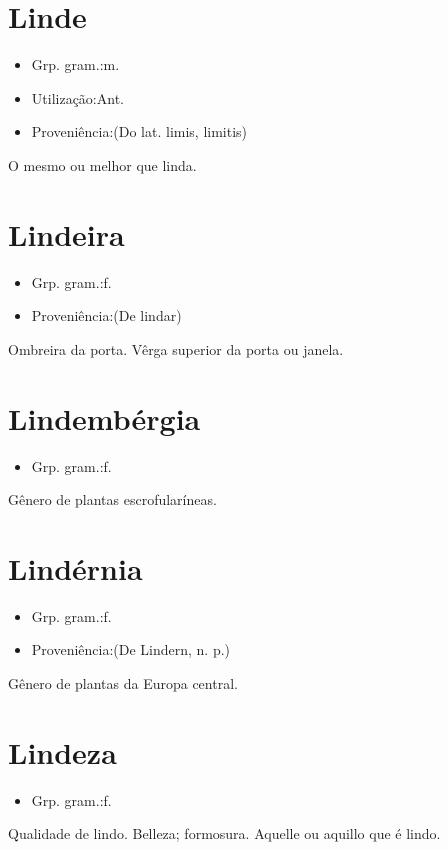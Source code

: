 \section{Linde}
\begin{itemize}
\item {Grp. gram.:m.}
\end{itemize}
\begin{itemize}
\item {Utilização:Ant.}
\end{itemize}
\begin{itemize}
\item {Proveniência:(Do lat. \textunderscore limis\textunderscore , \textunderscore limitis\textunderscore )}
\end{itemize}
O mesmo ou melhor que \textunderscore linda\textunderscore .
\section{Lindeira}
\begin{itemize}
\item {Grp. gram.:f.}
\end{itemize}
\begin{itemize}
\item {Proveniência:(De \textunderscore lindar\textunderscore )}
\end{itemize}
Ombreira da porta.
Vêrga superior da porta ou janela.
\section{Lindembérgia}
\begin{itemize}
\item {Grp. gram.:f.}
\end{itemize}
Gênero de plantas escrofularíneas.
\section{Lindérnia}
\begin{itemize}
\item {Grp. gram.:f.}
\end{itemize}
\begin{itemize}
\item {Proveniência:(De \textunderscore Lindern\textunderscore , n. p.)}
\end{itemize}
Gênero de plantas da Europa central.
\section{Lindeza}
\begin{itemize}
\item {Grp. gram.:f.}
\end{itemize}
Qualidade de lindo.
Belleza; formosura.
Aquelle ou aquillo que é lindo.

